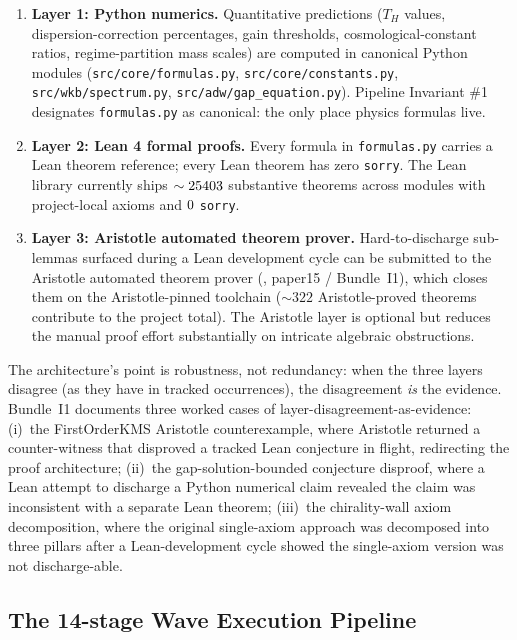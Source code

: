 \documentclass[aps,prd,reprint,nofootinbib,superscriptaddress]{revtex4-2}
\begin{document}
\begin{enumerate}
\item \textbf{Layer 1: Python numerics.} Quantitative predictions
  ($T_H$ values, dispersion-correction percentages, gain thresholds,
  cosmological-constant ratios, regime-partition mass scales) are
  computed in canonical Python modules (\texttt{src/core/formulas.py},
  \texttt{src/core/constants.py}, \texttt{src/wkb/spectrum.py},
  \texttt{src/adw/gap\_equation.py}). Pipeline Invariant \#1
  designates \texttt{formulas.py} as canonical: the only place
  physics formulas live.
\item \textbf{Layer 2: Lean 4 formal proofs.} Every formula in
  \texttt{formulas.py} carries a Lean theorem reference; every Lean
  theorem has zero \texttt{sorry}. The Lean library currently ships
  $\sim 25403$ substantive theorems across
  \leanmodules{} modules with \axiomcount{} project-local axioms and
  $0$ \texttt{sorry}.
\item \textbf{Layer 3: Aristotle automated theorem prover.}
  Hard-to-discharge sub-lemmas surfaced during a Lean development
  cycle can be submitted to the Aristotle automated theorem prover
  (\cite{Roehm2026Strategy}, paper15 / Bundle~I1), which closes them
  on the Aristotle-pinned toolchain ($\sim 322$ Aristotle-proved
  theorems contribute to the project total). The Aristotle layer is
  optional but reduces the manual proof effort substantially on
  intricate algebraic obstructions.
\end{enumerate}

The architecture's point is robustness, not redundancy: when the
three layers disagree (as they have in tracked occurrences), the
disagreement \emph{is} the evidence. Bundle~I1 documents three worked
cases of layer-disagreement-as-evidence: (i)~the FirstOrderKMS
Aristotle counterexample, where Aristotle returned a counter-witness
that disproved a tracked Lean conjecture in flight, redirecting the
proof architecture; (ii)~the gap-solution-bounded conjecture disproof,
where a Lean attempt to discharge a Python numerical claim revealed
the claim was inconsistent with a separate Lean theorem;
(iii)~the chirality-wall axiom decomposition, where the original
single-axiom approach was decomposed into three pillars after a
Lean-development cycle showed the single-axiom version was not
discharge-able.

\subsection{The 14-stage Wave Execution Pipeline}
\end{document}
